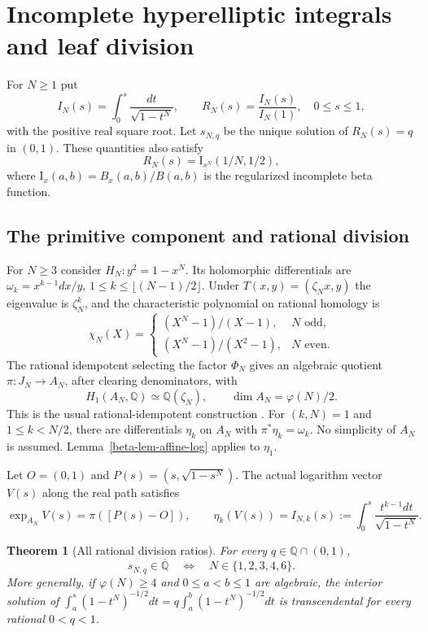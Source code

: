 \documentclass[11pt,a4paper]{article}
\newtheorem{theorem}{Theorem}[section]
\theoremstyle{definition}
\theoremstyle{remark}
\numberwithin{equation}{section}
\begin{document}
\section{Incomplete hyperelliptic integrals and leaf division}
\label{beta-sec-leaves}

For $N\ge1$ put
\[
I_N(s)=\int_0^s\frac{dt}{\sqrt{1-t^N}},\qquad
R_N(s)=\frac{I_N(s)}{I_N(1)},\quad 0\le s\le1,
\]
with the positive real square root.  Let $s_{N,q}$ be the unique solution
of $R_N(s)=q$ in $(0,1)$.  These quantities also satisfy
\begin{equation}\label{beta-eq-hyper-beta}
R_N(s)=\mathrm I_{s^N}(1/N,1/2),
\end{equation}
where $\mathrm I_x(a,b)=B_x(a,b)/B(a,b)$ is the regularized incomplete
beta function.

\subsection{The primitive component and rational division}

For $N\ge3$ consider $H_N:y^2=1-x^N$.  Its holomorphic differentials are
$\omega_k=x^{k-1}dx/y$, $1\le k\le\lfloor(N-1)/2\rfloor$.  Under
$T(x,y)=(\zeta_Nx,y)$ the eigenvalue is $\zeta_N^k$, and the
characteristic polynomial on rational homology is
\[
\chi_N(X)=
\begin{cases}(X^N-1)/(X-1),&N\text{ odd},\\
(X^N-1)/(X^2-1),&N\text{ even}.
\end{cases}
\]
The rational idempotent selecting the factor $\Phi_N$ gives an algebraic
quotient $\pi:J_N\to A_N$, after clearing denominators, with
\[
H_1(A_N,\mathbb Q)\simeq\mathbb Q(\zeta_N),\qquad
\dim A_N=\varphi(N)/2.
\]
This is the usual rational-idempotent construction
\cite{beta-carocca}.  For $(k,N)=1$ and $1\le k<N/2$, there are
differentials $\eta_k$ on $A_N$ with $\pi^*\eta_k=\omega_k$.
No simplicity of $A_N$ is assumed.  Lemma~\ref{beta-lem-affine-log}
applies to $\eta_1$.

Let $O=(0,1)$ and $P(s)=(s,\sqrt{1-s^N})$.  The actual logarithm vector
$V(s)$ along the real path satisfies
\[
\exp_{A_N}V(s)=\pi([P(s)-O]),\qquad
\eta_k(V(s))=I_{N,k}(s):=\int_0^s\frac{t^{k-1}dt}{\sqrt{1-t^N}}.
\]

\begin{theorem}[All rational division ratios]\label{beta-thm-rational-division}
For every $q\in\mathbb Q\cap(0,1)$,
\[
s_{N,q}\in\overline{\mathbb Q}
\quad\Longleftrightarrow\quad N\in\{1,2,3,4,6\}.
\]
More generally, if $\varphi(N)\ge4$ and $0\le a<b\le1$ are algebraic,
the interior solution of
$\int_a^s(1-t^N)^{-1/2}dt=q\int_a^b(1-t^N)^{-1/2}dt$
is transcendental for every rational $0<q<1$.
\end{theorem}
\end{document}
